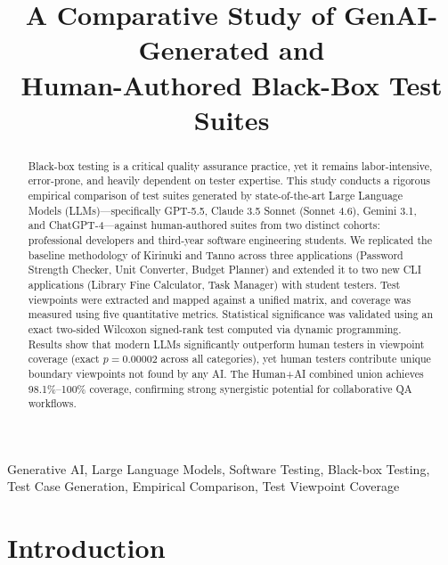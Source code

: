 \documentclass[conference]{IEEEtran}
\begin{document}
\title{A Comparative Study of GenAI-Generated and\\ Human-Authored Black-Box Test Suites}

\author{
}

\maketitle

\begin{abstract}
Black-box testing is a critical quality assurance practice, yet it remains labor-intensive, error-prone, and heavily dependent on tester expertise. This study conducts a rigorous empirical comparison of test suites generated by state-of-the-art Large Language Models (LLMs)—specifically GPT-5.5, Claude 3.5 Sonnet (Sonnet 4.6), Gemini 3.1, and ChatGPT-4—against human-authored suites from two distinct cohorts: professional developers and third-year software engineering students. We replicated the baseline methodology of Kirinuki and Tanno across three applications (Password Strength Checker, Unit Converter, Budget Planner) and extended it to two new CLI applications (Library Fine Calculator, Task Manager) with student testers. Test viewpoints were extracted and mapped against a unified matrix, and coverage was measured using five quantitative metrics. Statistical significance was validated using an exact two-sided Wilcoxon signed-rank test computed via dynamic programming. Results show that modern LLMs significantly outperform human testers in viewpoint coverage (exact $p = 0.00002$ across all categories), yet human testers contribute unique boundary viewpoints not found by any AI. The Human+AI combined union achieves 98.1\%–100\% coverage, confirming strong synergistic potential for collaborative QA workflows.
\end{abstract}

\begin{IEEEkeywords}
Generative AI, Large Language Models, Software Testing, Black-box Testing, Test Case Generation, Empirical Comparison, Test Viewpoint Coverage
\end{IEEEkeywords}

\section{Introduction}
\end{document}
